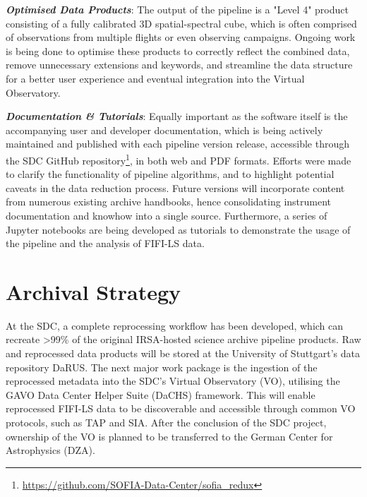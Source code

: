 \documentclass[11pt,twoside]{article}
\begin{document}
\textbf{\emph{Optimised Data Products}}: The output of the pipeline is a "Level 4" product consisting
of a fully calibrated 3D spatial-spectral cube, which is often comprised of observations from multiple flights
or even observing campaigns. Ongoing work is being done to optimise these products to correctly reflect
the combined data, remove unnecessary extensions and keywords, and streamline the data structure for
a better user experience and eventual integration into the Virtual Observatory.\smallskip

\textbf{\emph{Documentation \& Tutorials}}: Equally important as the software itself is the accompanying user and developer
documentation, which is being actively maintained and published with each pipeline version release, accessible
through the SDC GitHub repository\footnote{\url{https://github.com/SOFIA-Data-Center/sofia_redux}}, in both web and PDF formats. Efforts were made to clarify the functionality of pipeline
algorithms, and to highlight potential caveats in the data reduction process. Future versions will
incorporate content from numerous existing archive handbooks, hence consolidating instrument
documentation and knowhow into a single source. Furthermore, a series of Jupyter notebooks are being developed as tutorials
to demonstrate the usage of the pipeline and the analysis of FIFI-LS data.

\section{Archival Strategy}
At the SDC, a complete reprocessing workflow has been developed, which can recreate >99\% of the original
IRSA-hosted science archive pipeline products. Raw and reprocessed data products will be stored
at the University of Stuttgart's data repository DaRUS. The next major work package is the ingestion
of the reprocessed metadata into the SDC's Virtual Observatory (VO), utilising the GAVO Data Center Helper Suite (DaCHS) framework.
This will enable reprocessed FIFI-LS data to be discoverable and accessible through common VO protocols, such as TAP and SIA.
After the conclusion of the SDC project, ownership of the VO is planned to be transferred to the German Center for Astrophysics (DZA).



\end{document}
